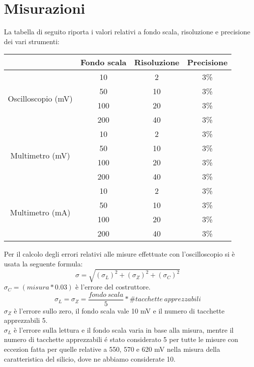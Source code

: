 \documentclass[]{article}
\begin{document}
\section{Misurazioni}
La tabella di seguito riporta i valori relativi a fondo scala, risoluzione e precisione dei vari strumenti:
\begin{center}
\begin{tabular}{|c|c|c|c|}
	\cline{2-4}
	\multicolumn{1}{c|}{} & Fondo scala & Risoluzione & Precisione \\
	\hline
	\multirow{4}{*}{Oscilloscopio (mV)} & 10 & 2 & 3\% \\
	\cline{2-4}
	& 50 & 10 & 3\% \\
	\cline{2-4}
	& 100 & 20 & 3\% \\
	\cline{2-4}
	& 200 & 40 & 3\% \\
	\hline
	\multirow{4}{*}{Multimetro (mV)} & 10 & 2 & 3\% \\
	\cline{2-4}
	& 50 & 10 & 3\% \\
	\cline{2-4}
	& 100 & 20 & 3\% \\
	\cline{2-4}
	& 200 & 40 & 3\% \\
	\hline
	\multirow{4}{*}{Multimetro (mA)} & 10 & 2 & 3\% \\
	\cline{2-4}
	& 50 & 10 & 3\% \\
	\cline{2-4}
	& 100 & 20 & 3\% \\
	\cline{2-4}
	& 200 & 40 & 3\% \\
	\hline
\end{tabular}
\end{center}
Per il calcolo degli errori relativi alle misure effettuate con l'oscilloscopio si è usata la seguente formula:
\begin{equation}
	\sigma=\sqrt{(\sigma_{L})^{2}+(\sigma_{Z})^{2}+(\sigma_{C})^{2}}
\end{equation}
$ 	\sigma_{C}= (misura*0.03) $ è l'errore del costruttore.
\begin{equation*}
	\sigma_{L}=\sigma_{Z}=\frac{fondo \:scala}{5}*\#tacchette \:apprezzabili
\end{equation*}
$ \sigma_{Z} $ è l'errore sullo zero, il fondo scala vale 10 mV e il numero di tacchette apprezzabili 5.\\
$ \sigma_{L} $ è l'errore sulla lettura e il fondo scala varia in base alla misura, mentre il numero di tacchette apprezzabili é stato considerato 5 per tutte le misure con eccezion fatta per quelle relative a 550, 570 e 620 mV nella misura della caratteristica del silicio, dove ne abbiamo considerate 10.
\end{document}
